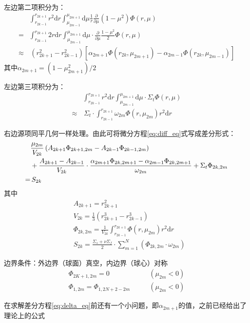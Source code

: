 \documentclass[a4paper,10.5pt]{article}
\newcommand\md {\mathrm{d}}
\begin{document}
\par
左边第二项积分为：
\begin{align*}
&\int_{r_{2k-1}}^{r_{2k+1}}r^{2}\md{}r\int_{\mu_{2m-1}}^{\mu_{2m+1}}\md\mu\frac{1}{r}\frac{\partial}{\partial\mu}(1-\mu^{2})\Phi(r,\mu)\\
=&\int_{r_{2k-1}}^{r_{2k+1}}2r\md{}r\int_{\mu_{2m-1}}^{\mu_{2m+1}}\md\mu\cdot\frac{\partial}{\partial\mu}\frac{1-\mu^{2}}{2}\Phi(r,\mu)\\
\approx&\,(r_{2k+1}^{2}-r_{2k-1}^{2})\left[\alpha_{2m+1}\Phi(r_{2k},\mu_{2m+1})-\alpha_{2m-1}\Phi(r_{2k},\mu_{2m-1})\right]
\end{align*}
其中$\alpha_{2m+1}=(1-\mu_{2m+1}^{2})/2$
\par
左边第三项积分为：
\begin{align*}
&\int_{r_{2k-1}}^{r_{2k+1}}r^{2}\md{}r\int_{\mu_{2m-1}}^{\mu_{2m+1}}\md\mu\cdot\Sigma_{t}\Phi(r,\mu)\\
\approx&\,\Sigma_{t}\cdot\int_{r_{2k-1}}^{r_{2k+1}}\omega_{2m}\Phi(r,\mu_{2m})r^{2}\md{}r
\end{align*}
\par
右边源项同平几何一样处理。由此可将微分方程\eqref{eq:diff_eq}式写成差分形式：
\begin{align}
&\frac{\mu_{2m}}{V_{2k}}\left(A_{2k+1}\Phi_{2k+1,2m}-A_{2k-1}\Phi_{2k-1,2m}\right)\notag\\
&+\frac{A_{2k+1}-A_{2k-1}}{V_{2k}}\cdot\frac{\alpha_{2m+1}\Phi_{2k,2m+1}-\alpha_{2m-1}\Phi_{2k,2m+1}}{\omega_{2m}}
+\Sigma_{t}\Phi_{2k,2m}\notag\\
=&\,{}S_{2k}\label{eq:delta_eq}
\end{align}
其中
\begin{align*}
&A_{2k+1}=r_{2k+1}^{2}\\
&V_{2k}=\frac{1}{3}(r_{2k+1}^{3}-r_{2k-1}^{3})\\
&\Phi_{2k,2m}=\frac{1}{V_{2k}}\int_{r_{2k-1}}^{r_{2k+1}}\Phi(r,\mu_{2m})r^{2}\md{}r\\
&S_{2k}=\frac{\Sigma_{s}+\nu\Sigma_{f}}{2}\cdot\sum_{m=1}^{N}\left(\Phi_{2k,2m}\cdot\omega_{2m}\right)
\end{align*}
\par
边界条件：外边界（球面）真空，内边界（球心）对称
\begin{align}
\Phi_{2K+1,2m}=0&\qquad(\mu_{2m}<0)\label{eq:outer_boundary}\\
\Phi_{1,2m}=\Phi_{1,2N+2-2m}&\qquad(\mu_{2m}<0)\label{eq:inner_boundary}
\end{align}
\par
在求解差分方程\eqref{eq:delta_eq}前还有一个小问题，即$\alpha_{2m+1}$的值，之前已经给出了理论上的公式
\end{document}
